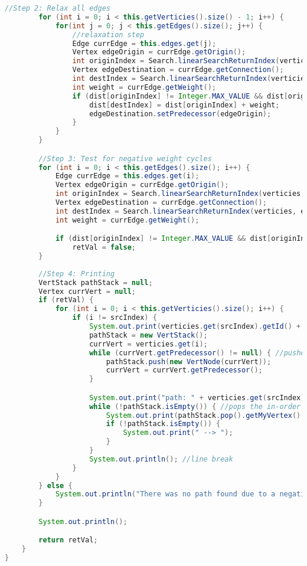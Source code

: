 \documentclass[letterpaper, 10pt,DIV=13]{scrartcl}
\numberwithin{equation}{section} %
\numberwithin{figure}{section} %
\numberwithin{table}{section} %
\begin{document}
\begin{lstlisting}[frame=single, language=java, breaklines]
        //Step 2: Relax all edges
        for (int i = 0; i < this.getVerticies().size() - 1; i++) {
            for(int j = 0; j < this.getEdges().size(); j++) {
                //relaxation step
                Edge currEdge = this.edges.get(j);
                Vertex edgeOrigin = currEdge.getOrigin();
                int originIndex = Search.linearSearchReturnIndex(verticies, edgeOrigin.getId());
                Vertex edgeDestination = currEdge.getConnection();
                int destIndex = Search.linearSearchReturnIndex(verticies, edgeDestination.getId());
                int weight = currEdge.getWeight();
                if (dist[originIndex] != Integer.MAX_VALUE && dist[originIndex] + weight < dist[destIndex]) {
                    dist[destIndex] = dist[originIndex] + weight;
                    edgeDestination.setPredecessor(edgeOrigin);
                }
            }
        }

        //Step 3: Test for negative weight cycles
        for (int i = 0; i < this.getEdges().size(); i++) {
            Edge currEdge = this.edges.get(i);
            Vertex edgeOrigin = currEdge.getOrigin();
            int originIndex = Search.linearSearchReturnIndex(verticies, edgeOrigin.getId());
            Vertex edgeDestination = currEdge.getConnection();
            int destIndex = Search.linearSearchReturnIndex(verticies, edgeDestination.getId());
            int weight = currEdge.getWeight();

            if (dist[originIndex] != Integer.MAX_VALUE && dist[originIndex] + weight < dist[destIndex])
                retVal = false;
        }
        
        //Step 4: Printing
        VertStack pathStack = null;
        Vertex currVert = null;
        if (retVal) {
            for (int i = 0; i < this.getVerticies().size(); i++) {
                if (i != srcIndex) {
                    System.out.print(verticies.get(srcIndex).getId() + " --> " + verticies.get(i).getId() + " cost is " + dist[i] + "; ");
                    pathStack = new VertStack();
                    currVert = verticies.get(i);
                    while (currVert.getPredecessor() != null) { //pushes the reverse path into the stack
                        pathStack.push(new VertNode(currVert));
                        currVert = currVert.getPredecessor();
                    }

                    System.out.print("path: " + verticies.get(srcIndex).getId() + " --> ");
                    while (!pathStack.isEmpty()) { //pops the in-order path from the stack and prints with formatting
                        System.out.print(pathStack.pop().getMyVertex().getId());
                        if (!pathStack.isEmpty()) {
                            System.out.print(" --> ");
                        }
                    }
                    System.out.println(); //line break
                }
            }
        } else {
            System.out.println("There was no path found due to a negative loop.");
        }

        System.out.println();

        return retVal;
    }
}
\end{lstlisting}
\end{document}
